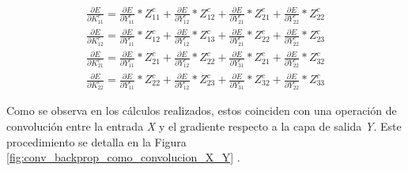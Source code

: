 \begin{gather}
	\frac{\partial E}{\partial K^c_{11}} = \frac{\partial E}{\partial Y^c_{11}} * Z^c_{11} + \frac{\partial E}{\partial Y^c_{12}} * Z^c_{12} + \frac{\partial E}{\partial Y^c_{21}} * Z^c_{21} + \frac{\partial E}{\partial Y^c_{22}} * Z^c_{22} \label{grad_Y_K_1} \\
	\frac{\partial E}{\partial K^c_{12}} = \frac{\partial E}{\partial Y^c_{11}} * Z^c_{12} + \frac{\partial E}{\partial Y^c_{12}} * Z^c_{13} + \frac{\partial E}{\partial Y^c_{21}} * Z^c_{22} + \frac{\partial E}{\partial Y^c_{22}} * Z^c_{23} \label{grad_Y_K_2} \\	
	\frac{\partial E}{\partial K^c_{21}} = \frac{\partial E}{\partial Y^c_{11}} * Z^c_{21} + \frac{\partial E}{\partial Y^c_{12}} * Z^c_{22} + \frac{\partial E}{\partial Y^c_{31}} * Z^c_{21} + \frac{\partial E}{\partial Y^c_{22}} * Z^c_{32} \label{grad_Y_K_3} \\
	\frac{\partial E}{\partial K^c_{22}} = \frac{\partial E}{\partial Y^c_{11}} * Z^c_{22} + \frac{\partial E}{\partial Y^c_{12}} * Z^c_{23} + \frac{\partial E}{\partial Y^c_{31}} * Z^c_{32} + \frac{\partial E}{\partial Y^c_{22}} * Z^c_{33} \label{grad_Y_K_4}
\end{gather}

Como se observa en los cálculos realizados, estos coinciden con una operación de convolución entre la entrada \textit{X} y el gradiente respecto a la capa de salida \textit{Y}. Este procedimiento se detalla en la Figura \ref{fig:conv_backprop_como_convolucion_X_Y} \cite{conv_backprop}.


